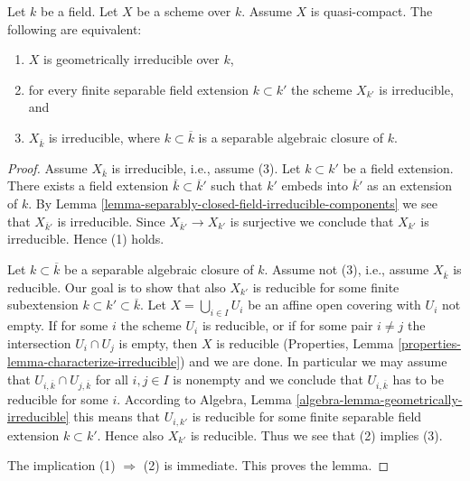 \begin{lemma}
\label{lemma-characterize-geometrically-irreducible}
Let $k$ be a field. Let $X$ be a scheme over $k$.
Assume $X$ is quasi-compact. The following are equivalent:
\begin{enumerate}
\item $X$ is geometrically irreducible over $k$,
\item for every finite separable field extension $k \subset k'$
the scheme $X_{k'}$ is irreducible, and
\item $X_{\overline{k}}$ is irreducible, where $k \subset \overline{k}$
is a separable algebraic closure of $k$.
\end{enumerate}
\end{lemma}

\begin{proof}
Assume $X_{\overline{k}}$ is irreducible, i.e., assume (3).
Let $k \subset k'$ be a field extension.
There exists a field extension $\overline{k} \subset \overline{k}'$
such that $k'$ embeds into $\overline{k}'$ as an extension of $k$.
By Lemma \ref{lemma-separably-closed-field-irreducible-components}
we see that $X_{\overline{k}'}$ is irreducible.
Since $X_{\overline{k}'} \to X_{k'}$ is surjective we conclude
that $X_{k'}$ is irreducible. Hence (1) holds.

\medskip\noindent
Let $k \subset \overline{k}$ be a separable algebraic closure of $k$.
Assume not (3), i.e., assume $X_{\overline{k}}$ is reducible.
Our goal is to show that also $X_{k'}$ is
reducible for some finite subextension
$k \subset k' \subset \overline{k}$.
Let $X = \bigcup_{i \in I} U_i$ be an affine open covering
with $U_i$ not empty. If for some $i$ the scheme
$U_i$ is reducible, or if for some pair $i \not = j$ the
intersection $U_i \cap U_j$ is empty, then $X$ is reducible
(Properties, Lemma \ref{properties-lemma-characterize-irreducible})
and we are done.
In particular we may assume that
$U_{i, \overline{k}} \cap U_{j, \overline{k}}$ for all $i, j \in I$
is nonempty and we conclude that $U_{i, \overline{k}}$ has
to be reducible for some $i$. According to
Algebra, Lemma \ref{algebra-lemma-geometrically-irreducible}
this means that $U_{i, k'}$ is reducible for some
finite separable field extension $k \subset k'$.
Hence also $X_{k'}$ is reducible. Thus we see that
(2) implies (3).

\medskip\noindent
The implication (1) $\Rightarrow$ (2) is immediate.
This proves the lemma.
\end{proof}

